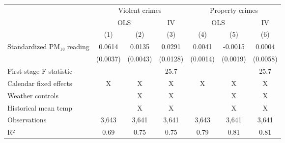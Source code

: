 \begingroup
\setlength{}
\setlength{}\fontsize{10.0pt}{12.0pt}\selectfont
\begin{longtable}{@{\extracolsep{\fill}}lcccccc}
\toprule
 & \multicolumn{3}{c}{Violent crimes} & \multicolumn{3}{c}{Property crimes} \\ 
\cmidrule(lr){2-4} \cmidrule(lr){5-7}
 & \multicolumn{2}{c}{OLS} & IV & \multicolumn{2}{c}{OLS} & IV \\ 
\cmidrule(lr){2-3} \cmidrule(lr){4-4} \cmidrule(lr){5-6} \cmidrule(lr){7-7}
  & (1) & (2) & (3) & (4) & (5) & (6) \\ 
\midrule\addlinespace[2.5pt]
Standardized PM₁₀ reading & 0.0614 & 0.0135 & 0.0291 & 0.0041 & -0.0015 & 0.0004 \\ 
{} & {(0.0037)} & {(0.0043)} & {(0.0128)} & {(0.0014)} & {(0.0019)} & {(0.0058)} \\ 
First stage F-statistic &  &  & 25.7 &  &  & 25.7 \\ 
Calendar fixed effects & X & X & X & X & X & X \\ 
Weather controls &  & X & X &  & X & X \\ 
Historical mean temp &  & X & X &  & X & X \\ 
Observations & 3,643 & 3,641 & 3,641 & 3,643 & 3,641 & 3,641 \\ 
R² & 0.69 & 0.75 & 0.75 & 0.79 & 0.81 & 0.81 \\ 
\bottomrule
\end{longtable}
\endgroup

